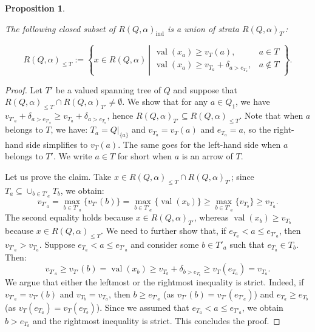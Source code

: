 \documentclass[11pt,english]{article}
\numberwithin{equation}{section}
\numberwithin{figure}{section}
\theoremstyle{definition}
\theoremstyle{plain}
\newtheorem{prop}[df]{Proposition}
\theoremstyle{remark}
\DeclareMathOperator{\val}{val}
\begin{document}
\begin{prop} \label{Prop/Strata}

The following closed subset of $R(Q,\alpha)_{\mathrm{ind}}$ is a
union of strata $R(Q,\alpha)_{T'}$:

\[
R(Q,\alpha)_{\leq T}
:=
\left\{
x\in R(Q,\alpha)\
\left\vert 
\begin{array}{ll}
\val(x_{a})\geq v_{T}(a), & a\in T \\
\val(x_{a})\geq v_{T_{a}}+\delta_{a>e_{T_{a}}}, & a\not\in T
\end{array}
\right.
\right\}
.
\]

\end{prop}

\begin{proof}

Let $T'$ be a valued spanning tree of $Q$ and suppose that $R(Q,\alpha)_{\leq T}\cap R(Q,\alpha)_{T'}\ne\emptyset$.
We show that for any $a\in Q_{1}$, we have $v_{T'_{a}}+\delta_{a>e_{T'_{a}}}\geq v_{T_{a}}+\delta_{a>e_{T_{a}}}$,
hence $R(Q,\alpha)_{T'}\subseteq R(Q,\alpha)_{\leq T}$. Note that
when $a$ belongs to $T$, we have: $T_{a}=Q\vert_{\{a\}}$ and $v_{T_{a}}=v_{T}(a)$
and $e_{T_{a}}=a$, so the right-hand side simplifies to $v_{T}(a)$.
The same goes for the left-hand side when $a$ belongs to $T'$. We
write $a\in T$ for short when $a$ is an arrow of $T$.

Let us prove the claim. Take $x\in R(Q,\alpha)_{\leq T}\cap R(Q,\alpha)_{T'}$;
since $T_{a}\subseteq\cup_{b\in T'_{a}}T_{b}$, we obtain:\[
v_{T'_{a}}=\max_{b\in T'_{a}}\{v_{T'}(b)\}=\max_{b\in T'_{a}}\{\val(x_{b})\}\geq\max_{b\in T'_{a}}\{v_{T_{b}}\}\geq v_{T_{a}}.
\]The second equality holds because $x\in R(Q,\alpha)_{T'}$, whereas
$\val(x_{b})\geq v_{T_{b}}$ because $x\in R(Q,\alpha)_{\leq T}$.
We need to further show that, if $e_{T_{a}}<a\leq e_{T'_{a}}$, then
$v_{T'_{a}}>v_{T_{a}}$. Suppose $e_{T_{a}}<a\leq e_{T'_{a}}$ and
consider some $b\in T'_{a}$ such that $e_{T_{a}}\in T_{b}$. Then:\[
v_{T'_a}\geq v_{T'}(b)=\val(x_b)\geq v_{T_b}+\delta_{b>e_{T_b}}\geq v_T(e_{T_a})=v_{T_a}.
\]We argue that either the leftmost or the rightmost inequality is strict.
Indeed, if $v_{T'_{a}}=v_{T'}(b)$ and $v_{T_{b}}=v_{T_{a}}$, then
$b\geq e_{T'_{a}}$ (as $v_{T'}(b)=v_{T'}(e_{T'_{a}})$) and $e_{T_{a}}\geq e_{T_{b}}$
(as $v_{T}(e_{T_{a}})=v_{T}(e_{T_{b}})$). Since we assumed that $e_{T_{a}}<a\leq e_{T'_{a}}$,
we obtain $b>e_{T_{b}}$ and the rightmost inequality is strict. This
concludes the proof. \end{proof}
\end{document}
